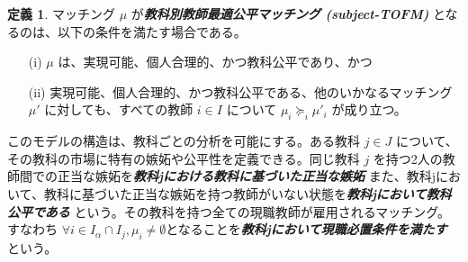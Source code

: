 \documentclass[12pt, a4paper]{article}
\theoremstyle{definition}
\newtheorem{defn}{定義}
\theoremstyle{remark}
\theoremstyle{plain}
\begin{document}
\begin{defn}
マッチング $\mu$ が\textbf{\textit{教科別教師最適公平マッチング (subject-TOFM)}} となるのは、以下の条件を満たす場合である。
\begin{itemize}
    \item[(i)] $\mu$ は、実現可能、個人合理的、かつ教科公平であり、かつ
    \item[(ii)] 実現可能、個人合理的、かつ教科公平である、他のいかなるマッチング $\mu'$ に対しても、すべての教師 $i \in I$ について $\mu_i \succeq_i \mu'_i$ が成り立つ。
\end{itemize}
\end{defn}










このモデルの構造は、教科ごとの分析を可能にする。ある教科 $j \in J$ について、その教科の市場に特有の嫉妬や公平性を定義できる。同じ教科 $j$ を持つ2人の教師間での正当な嫉妬を\textbf{\textit{教科jにおける教科に基づいた正当な嫉妬}} また、教科jにおいて、教科に基づいた正当な嫉妬を持つ教師がいない状態を\textbf{\textit{教科jにおいて教科公平である}} という。その教科を持つ全ての現職教師が雇用されるマッチング。すなわち $\forall i \in I_\alpha \cap I_j, \mu_i \neq \emptyset$となることを\textbf{\textit{教科jにおいて現職必置条件を満たす}} という。
\end{document}
